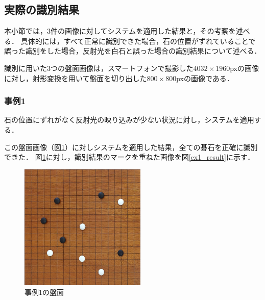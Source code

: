 \documentclass[openright]{nitocs}
\numberwithin{equation}{section}
\begin{document}
        \subsection{実際の識別結果} %
        \label{identify_result}
            本小節では，3件の画像に対してシステムを適用した結果と，その考察を述べる．
            具体的には，すべて正常に識別できた場合，石の位置がずれていることで誤った識別をした場合，反射光を白石と誤った場合の識別結果について述べる．

            識別に用いた3つの盤面画像は，スマートフォンで撮影した$4032\times1960$pxの画像に対し，射影変換を用いて盤面を切り出した$800\times800$pxの画像である．

            \subsubsection{事例1}
                石の位置にずれがなく反射光の映り込みが少ない状況に対し，システムを適用する．

                この盤面画像（図\ref{ex1}）に対しシステムを適用した結果，全ての碁石を正確に識別できた．
                図\ref{ex1}に対し，識別結果のマークを重ねた画像を図\ref{ex1_result}に示す．
                \begin{figure}[tb] %
                    \begin{center}
                    \includegraphics[clip,width=60mm]{DSC_0041/boardImg.jpg} 
                    \caption{事例1の盤面}
                    \label{ex1}
                    \end{center}
                \end{figure}
\end{document}
